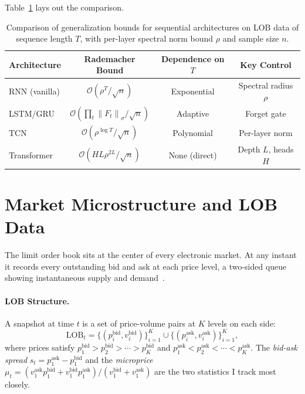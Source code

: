 \documentclass[11pt]{article}
\theoremstyle{definition}
\theoremstyle{remark}
\newcommand{\cO}{\mathcal{O}}
\newcommand{\norm}[1]{\left\lVert #1 \right\rVert}
\begin{document}
Table~\ref{tab:complexity_comparison} lays out the comparison.

\begin{table}[H]
\centering
\caption{Comparison of generalization bounds for sequential architectures on LOB data of sequence length $T$, with per-layer spectral norm bound $\rho$ and sample size $n$.}
\label{tab:complexity_comparison}
\begin{tabular}{@{}lccc@{}}
\toprule
\textbf{Architecture} & \textbf{Rademacher Bound} & \textbf{Dependence on $T$} & \textbf{Key Control} \\
\midrule
RNN (vanilla) & $\cO(\rho^T / \sqrt{n})$ & Exponential & Spectral radius $\rho$ \\
LSTM/GRU & $\cO(\prod_t \norm{F_t}_\sigma / \sqrt{n})$ & Adaptive & Forget gate \\
TCN & $\cO(\rho^{\log T} / \sqrt{n})$ & Polynomial & Per-layer norm \\
Transformer & $\cO(H L \rho^{2L} / \sqrt{n})$ & None (direct) & Depth $L$, heads $H$ \\
\bottomrule
\end{tabular}
\end{table}


\section{Market Microstructure and LOB Data}\label{sec:microstructure}

The limit order book sits at the center of every electronic market.
At any instant it records every outstanding bid and ask at each price level, a two-sided queue showing instantaneous supply and demand~\citep{bouchaud2018trades}.

\paragraph{LOB Structure.}
A snapshot at time $t$ is a set of price-volume pairs at $K$ levels on each side:
\[
    \mathrm{LOB}_t = \{(p_i^{\mathrm{bid}}, v_i^{\mathrm{bid}})\}_{i=1}^K \cup \{(p_i^{\mathrm{ask}}, v_i^{\mathrm{ask}})\}_{i=1}^K,
\]
where prices satisfy $p_1^{\mathrm{bid}} > p_2^{\mathrm{bid}} > \cdots > p_K^{\mathrm{bid}}$ and $p_1^{\mathrm{ask}} < p_2^{\mathrm{ask}} < \cdots < p_K^{\mathrm{ask}}$.
The \emph{bid-ask spread} $s_t = p_1^{\mathrm{ask}} - p_1^{\mathrm{bid}}$ and the \emph{microprice} $\mu_t = (v_1^{\mathrm{ask}} p_1^{\mathrm{bid}} + v_1^{\mathrm{bid}} p_1^{\mathrm{ask}}) / (v_1^{\mathrm{bid}} + v_1^{\mathrm{ask}})$ are the two statistics I track most closely.
\end{document}

